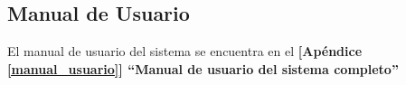 \subsection{Manual de Usuario}
El manual de usuario del sistema se encuentra en el \textbf{[Apéndice \ref{manual_usuario}] ``Manual de usuario del sistema completo''}